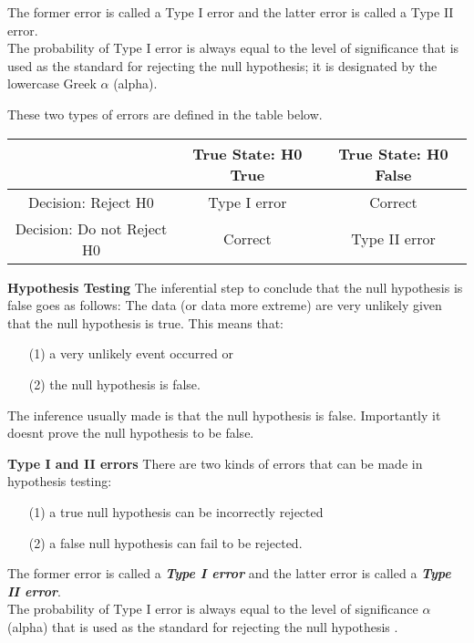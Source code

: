 The former error is called a Type I error and the latter error is called a Type II error. \\

The probability of Type I error is always equal to the level of significance that is used as the standard for rejecting
the null hypothesis; it is designated by the lowercase Greek $\alpha$ (alpha).





These two types of errors are defined in the table below.

\begin{center}
\begin{tabular}{|c|c|c|}
\hline
&True State: H0 True	& True State: H0 False\\\hline
Decision: Reject H0	& Type I error&	Correct\\
Decision: Do not Reject H0	& Correct 	&Type II error\\ \hline
\end{tabular}
\end{center}





\noindent \textbf{Hypothesis Testing}
\large
The inferential step to conclude that the null hypothesis is false goes as follows: The data (or data more extreme) are very unlikely given that the null hypothesis is true.
\bigskip
This means that:
\begin{itemize}\item [(1)] a very unlikely event occurred or
\item[(2)] the null hypothesis is false. \end{itemize}
The inference usually made is that the null hypothesis is false. Importantly it doesnt prove the null hypothesis to be false.


\noindent \textbf{Type I and II errors}
\large
There are two kinds of errors that can be made in hypothesis testing:
\begin{itemize}
\item[(1)] a true null hypothesis can be incorrectly rejected
\item[(2)] a false null hypothesis can fail to be rejected.
\end{itemize}
The former error is called a \textbf{\emph{Type I error}} and the latter error is called a \textbf{\emph{Type II error}}. \\ \bigskip
The probability of Type I error is always equal to the level of significance $\alpha$ (alpha) that is used as the standard for rejecting the null hypothesis .

